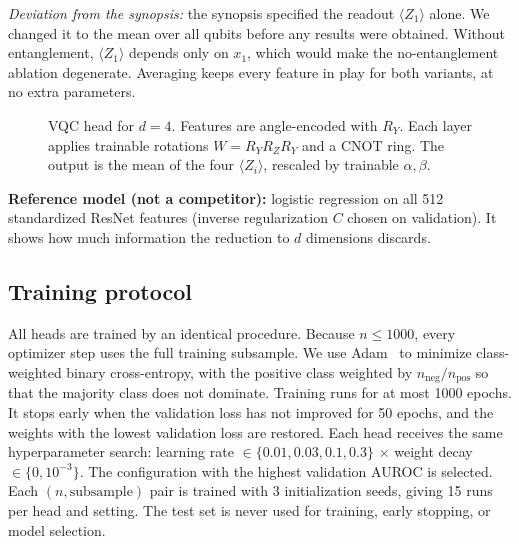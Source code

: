 \documentclass[conference]{IEEEtran}
\begin{document}
\emph{Deviation from the synopsis:} the synopsis specified the readout
$\langle Z_1\rangle$ alone. We changed it to the mean over all qubits
before any results were obtained. Without entanglement, $\langle Z_1\rangle$
depends only on $x_1$, which would make the no-entanglement ablation
degenerate. Averaging keeps every feature in play for both variants, at no
extra parameters.

\begin{figure}[t]
\centering
\ifdefined\quantikz
{}
\else
{}
\fi
\caption{VQC head for $d=4$. Features are angle-encoded with $R_Y$. Each
layer applies trainable rotations $W=R_YR_ZR_Y$ and a CNOT ring. The output
is the mean of the four $\langle Z_i\rangle$, rescaled by trainable
$\alpha,\beta$.}
\label{fig:circuit}
\end{figure}

\textbf{Reference model (not a competitor):} logistic regression on all 512
standardized ResNet features (inverse regularization $C$ chosen on
validation). It shows how much information the reduction to $d$ dimensions
discards.

\subsection{Training protocol}
All heads are trained by an identical procedure. Because $n\le1000$, every
optimizer step uses the full training subsample. We use Adam~\cite{kingma2015}
to minimize class-weighted binary cross-entropy, with the positive class
weighted by $n_{\mathrm{neg}}/n_{\mathrm{pos}}$ so that the majority class
does not dominate. Training runs for at most 1000 epochs. It stops early
when the validation loss has not improved for 50 epochs, and the weights
with the lowest validation loss are restored. Each head receives the same
hyperparameter search: learning rate $\in\{0.01,0.03,0.1,0.3\}$ $\times$ weight
decay $\in\{0,10^{-3}\}$. The configuration with the highest validation
AUROC is selected. Each $(n,\text{subsample})$ pair is trained with 3
initialization seeds, giving 15 runs per head and setting. The test set is
never used for training, early stopping, or model selection.
\end{document}

